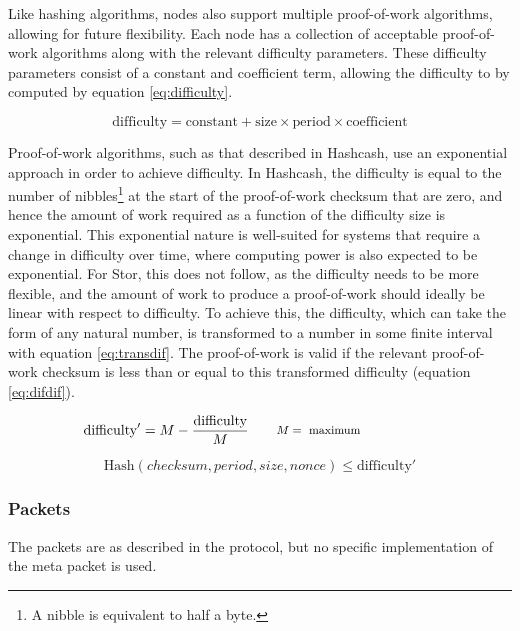 			Like hashing algorithms, nodes also support multiple proof-of-work algorithms, allowing for future flexibility. Each node has a collection of acceptable proof-of-work algorithms along with the relevant difficulty parameters. These difficulty parameters consist of a constant and coefficient term, allowing the difficulty to by computed by equation \ref{eq:difficulty}. 
		
			\begin{equation} \label{eq:difficulty}
			\text{difficulty} = \text{constant} + \text{size} \times \text{period} \times \text{coefficient}
			\end{equation}
			
			Proof-of-work algorithms, such as that described in Hashcash, use an exponential approach in order to achieve difficulty. In Hashcash, the difficulty is equal to the number of nibbles\footnote{A nibble is equivalent to half a byte.} at the start of the proof-of-work checksum that are zero, and hence the amount of work required as a function of the difficulty size is exponential. This exponential nature is well-suited for systems that require a change in difficulty over time, where computing power is also expected to be exponential. For Stor, this does not follow, as the difficulty needs to be more flexible, and the amount of work to produce a proof-of-work should ideally be linear with respect to difficulty. To achieve this, the difficulty, which can take the form of any natural number, is transformed to a number in some finite interval with equation \ref{eq:transdif}. The proof-of-work is valid if the relevant proof-of-work checksum is less than or equal to this transformed difficulty (equation \ref{eq:difdif}).
		
			\begin{equation} \label{eq:transdif}
			\text{difficulty}' = M - \frac{\text{difficulty}}{M}
			\qquad\parbox{4.0cm}{\footnotesize$\begin{aligned} M &= \text{ maximum}\end{aligned}$}
			\end{equation}
			
			\begin{equation} \label{eq:difdif}
			\text{Hash}(checksum, period, size, nonce) \le \text{difficulty}'
			\end{equation}

				
		
		\subsubsection*{Packets}
			The packets are as described in the protocol, but no specific implementation of the meta packet is used.
			
